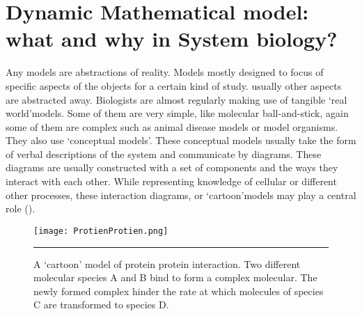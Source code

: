 \section{Dynamic Mathematical model: what and why in System biology?}
Any models are abstractions of reality. Models mostly designed to focus of specific aspects of the objects for a certain kind of study. usually other aspects are abstracted away. Biologists are almost regularly making use of tangible \lq real world\rq  models. Some of them are very simple, like molecular ball-and-stick, again some of them are complex such as animal disease models or model organisms. They also use \lq conceptual models\rq. These conceptual models usually take the form of verbal descriptions of the system and communicate by diagrams. These diagrams are usually constructed with a set of components and the ways they interact with each other. While representing knowledge of cellular or different other processes, these interaction diagrams, or \lq cartoon\rq models may play a central role (\cite{Ingalls:2012}).

\begin{figure}%
	\centering
		\texttt{[image: ProtienProtien.png]}
		\rule{35em}{0.5pt}
	\caption[A ‘cartoon’ model of protein protein interaction.]{A ‘cartoon’ model of protein protein interaction. Two different molecular species A and B bind to form a complex molecular. The newly formed complex hinder the rate at which molecules of species C are transformed to species D.}
	\label{fig:Protein protein interaction}
\end{figure}

